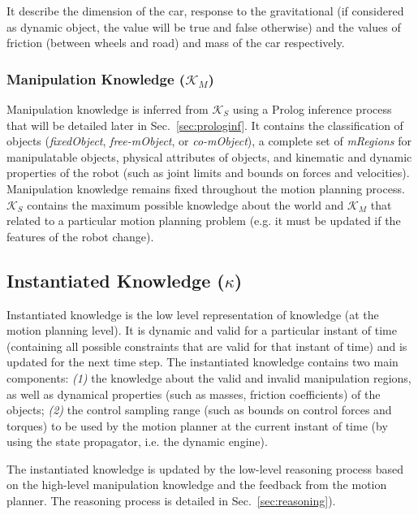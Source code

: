 \documentclass[twocolumn]{svjour3}          %
\begin{document}
It describe the dimension of the car, response to the gravitational (if considered as dynamic object, the value will be true and false otherwise) and the values of 
friction (between wheels and road) and mass of the car respectively.


\subsubsection{Manipulation Knowledge ($\mathcal{K}_M$) }

Manipulation knowledge is inferred from $\mathcal{K}_S$  using a Prolog inference process that will be detailed later in Sec.~\ref{sec:prologinf}. It contains the classification of 
objects 
(\textit{fixedObject}, \textit{free-mObject}, or 
\textit{co-mObject}), a complete set of \textit{mRegions} for manipulatable objects, physical attributes of objects, and kinematic and dynamic properties of the robot (such as joint limits and bounds 
on forces and velocities). Manipulation knowledge remains fixed throughout the motion planning process. $\mathcal{K}_S$ contains the maximum possible knowledge about the world and $\mathcal{K}_M$ 
that related to a particular motion planning problem (e.g. it must be updated if the features of the robot change).

\subsection{Instantiated Knowledge ($\kappa$)}
Instantiated knowledge is the low level representation of  knowledge (at the motion planning level). It is dynamic and valid for a particular instant of time (containing all possible constraints that are valid for that instant of time) and is updated for the next time step. The instantiated knowledge contains two main components: \textit{(1)} the knowledge about the valid and invalid manipulation regions, as well as  dynamical properties (such as masses, friction coefficients) of the objects; \textit{(2)} the control sampling range (such as bounds on control forces and torques) to be used by the motion planner at the current instant of time (by using the state propagator, i.e. the dynamic engine).

The instantiated knowledge is updated by the low-level reasoning process  based on the high-level manipulation knowledge and the feedback from the motion planner. The reasoning process is detailed in Sec.~\ref{sec:reasoning}).

\end{document}
